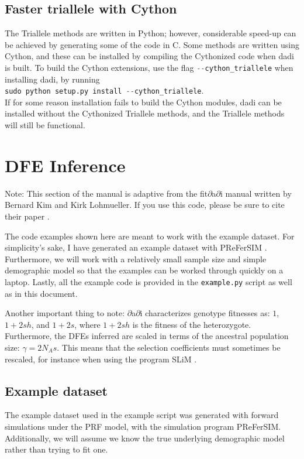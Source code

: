 \documentclass[12pt]{article}
\makeatletter
\newcommand{\dadi}{dadi\xspace}
\newcommand{\py}[1]{\lstinline[language=Python, showstringspaces=False]@#1@}
\makeatother
\begin{document}
\subsection{Faster triallele with Cython}
The Triallele methods are written in Python; however, considerable speed-up can be achieved by generating some of the code in C.
Some methods are written using Cython, and these can be installed by compiling the Cythonized code when \dadi is built.
To build the Cython extensions, use the flag \py{--cython_triallele} when installing \dadi, by running\\
\py{sudo python setup.py install --cython_triallele}.\\
If for some reason installation fails to build the Cython modules, \dadi can be installed without the Cythonized Triallele methods, and the Triallele methods will still be functional.


\section{DFE Inference}

Note: This section of the manual is adaptive from the fit$\partial$a$\partial$i manual written by Bernard Kim and Kirk Lohmueller. If you use this code, please be sure to cite their paper \cite{Kim2017}.

The code examples shown here are meant to work with the example dataset. For simplicity's sake, I have generated an example dataset with PReFerSIM \cite{ortega2016}. Furthermore, we will work with a relatively small sample size and simple demographic model so that the examples can be worked through quickly on a laptop. Lastly, all the example code is provided in the \texttt{example.py} script as well as in this document.

Another important thing to note: $\partial$a$\partial$i characterizes genotype fitnesses as: $1$, $1+2sh$, and $1+2s$, where $1+2sh$ is the fitness of the heterozygote. Furthermore, the DFEs inferred are scaled in terms of the ancestral population size: $\gamma=2N_{A}s$. This means that the selection coefficients must sometimes be rescaled, for instance when using the program SLiM \cite{haller2016}.

\subsection{Example dataset}
The example dataset used in the example script was generated with forward simulations under the PRF model, with the simulation program PReFerSIM. Additionally, we will assume we know the true underlying demographic model rather than trying to fit one.
\end{document}
